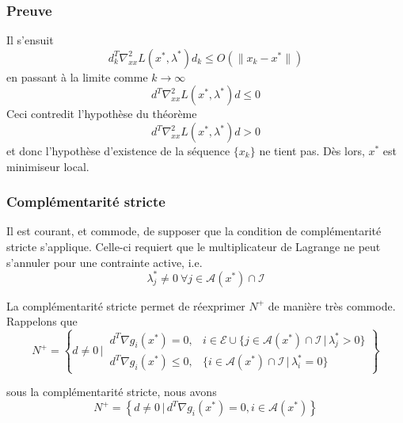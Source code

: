 \documentclass[usepdftitle=false,aspectratio=169]{beamer}
\def\cA{\mathcal{A}}
\def\cB{\mathcal{B}}
\def\cE{\mathcal{E}}
\def\cI{\mathcal{I}}
\begin{document}
\begin{frame}
\frametitle{Preuve}

Il s'ensuit
$$
d_k^T \nabla^2_{xx} L(x^*,\lambda^*) d_k \leq O( \| x_k - x^* \| )
$$
en passant à la limite comme $k \rightarrow \infty$
$$
d^T \nabla^2_{xx} L(x^*,\lambda^*) d \leq 0
$$
Ceci contredit l'hypothèse du théorème
$$
d^T \nabla^2_{xx} L(x^*,\lambda^*) d > 0
$$
et donc l'hypothèse d'existence de la séquence $\{ x_k \}$ ne tient pas. Dès lors, $x^*$ est minimiseur local.

\end{frame}






\begin{frame}
\frametitle{Complémentarité stricte}

Il est courant, et commode, de supposer que la condition de complémentarité stricte s'applique. Celle-ci requiert que le multiplicateur de Lagrange ne peut s'annuler pour une contrainte active, i.e.
$$
\lambda_j^* \ne 0\ \forall j \in \cA(x^*) \cap \cI
$$

\mbox{}

La complémentarité stricte permet de réexprimer $N^+$ de manière très commode. Rappelons que
$$
N^+ =
\left\lbrace d \ne 0 \,\bigg|\,
\begin{matrix}
d^T \nabla g_i(x^*) = 0, & i \in \cE \cup \{ j \in \cA(x^*) \cap \cI \,|\, \lambda_j^* > 0 \} \\
d^T \nabla g_i(x^*) \leq 0, & \{ i \in \cA(x^*) \cap \cI \,|\, \lambda_i^* = 0 \} 
\end{matrix}
\right\rbrace
$$


sous la complémentarité stricte, nous avons
$$
N^+ =
\left\lbrace d \ne 0 \,|\,
d^T \nabla g_i(x^*) = 0, i \in \cA(x^*)
\right\rbrace
$$

\end{frame}
\end{document}
